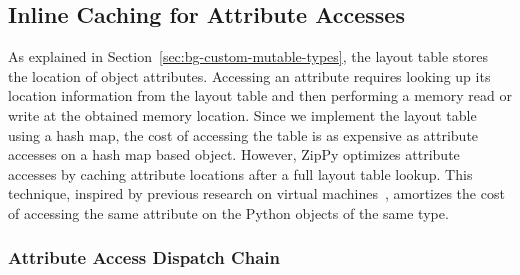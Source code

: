 \subsection{Inline Caching for Attribute Accesses}

As explained in Section~\ref{sec:bg-custom-mutable-types}, the layout table stores the location of object attributes.
Accessing an attribute requires looking up its location information from the layout table and then performing a memory read or write at the obtained memory location.
Since we implement the layout table using a hash map, the cost of accessing the table is as expensive as attribute accesses on a hash map based object.
However, ZipPy optimizes attribute accesses by caching attribute locations after a full layout table lookup.
This technique, inspired by previous research on virtual machines~\cite{Deutsch1984, Holzle+1991, Brunthaler2010inca}, amortizes the cost of accessing the same attribute on the Python objects of the same type.

\subsubsection{Attribute Access Dispatch Chain}
\label{sec:bg-attribute-access-dispatch-chain}

